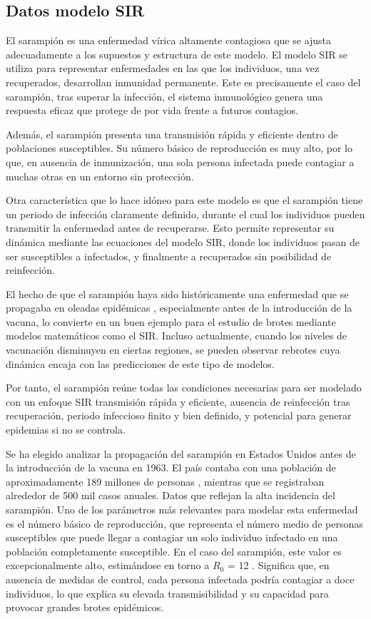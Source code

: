 \subsection{Datos modelo SIR}
El sarampión es una enfermedad vírica altamente contagiosa que se ajusta adecuadamente a los supuestos y estructura de este modelo. El modelo SIR se utiliza para representar enfermedades en las que los individuos, una vez recuperados, desarrollan inmunidad permanente. Este es precisamente el caso del sarampión, tras superar la infección, el sistema inmunológico genera una respuesta eficaz que protege de por vida frente a futuros contagios.

Además, el sarampión presenta una transmisión rápida y eficiente dentro de poblaciones susceptibles. Su número básico de reproducción es muy alto, por lo que, en ausencia de inmunización, una sola persona infectada puede contagiar a muchas otras en un entorno sin protección.

Otra característica que lo hace idóneo para este modelo es que el sarampión tiene un periodo de infección claramente definido, durante el cual los individuos pueden transmitir la enfermedad antes de recuperarse. Esto permite representar su dinámica mediante las ecuaciones del modelo SIR, donde los individuos pasan de ser susceptibles a infectados, y finalmente a recuperados sin posibilidad de reinfección.

El hecho de que el sarampión haya sido históricamente una enfermedad que se propagaba en oleadas epidémicas , especialmente antes de la introducción de la vacuna, lo convierte en un buen ejemplo para el estudio de brotes mediante modelos matemáticos como el SIR. Incluso actualmente, cuando los niveles de vacunación disminuyen en ciertas regiones, se pueden observar rebrotes cuya dinámica encaja con las predicciones de este tipo de modelos.

Por tanto, el sarampión reúne todas las condiciones necesarias para ser modelado con un enfoque SIR transmisión rápida y eficiente, ausencia de reinfección tras recuperación, periodo infeccioso finito y bien definido, y potencial para generar epidemias si no se controla. 

Se ha elegido analizar la propagación del sarampión en Estados Unidos antes de la introducción de la vacuna en 1963. El país contaba con una población de aproximadamente 189 millones de personas \cite{datosmacro_usa_1963}, mientras que se registraban alrededor de 500 mil casos anuales. Datos que reflejan la alta incidencia del sarampión.
Uno de los parámetros más relevantes para modelar esta enfermedad es el número básico de reproducción, que representa el número medio de personas susceptibles que puede llegar a contagiar un solo individuo infectado en una población completamente susceptible. En el caso del sarampión, este valor es excepcionalmente alto, estimándose en torno a $R_0$ = 12 \cite{solomon2019peter}. Significa que, en ausencia de medidas de control, cada persona infectada podría contagiar a doce individuos, lo que explica su elevada transmisibilidad y su capacidad para provocar grandes brotes epidémicos.

